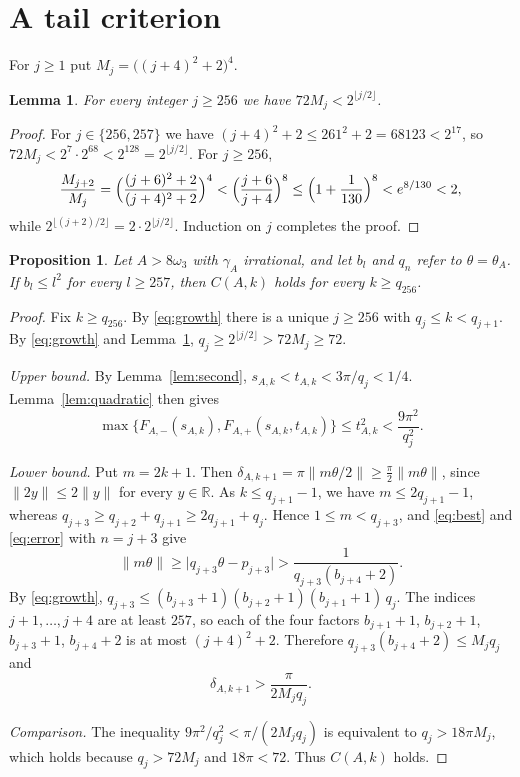 \documentclass{amsart}
\newtheorem{proposition}[theorem]{Proposition}
\newtheorem{lemma}[theorem]{Lemma}
\theoremstyle{definition}
\theoremstyle{remark}
\numberwithin{equation}{section}
\newcommand{\R}{\mathbb{R}}
\newcommand{\norm}[1]{\lVert #1 \rVert}
\begin{document}
\section{A tail criterion}\label{sec:tail}

For $j\ge1$ put $M_j=\bigl((j+4)^2+2\bigr)^4$.

\begin{lemma}\label{lem:numbers}
For every integer $j\ge256$ we have $72M_j<2^{\lfloor j/2\rfloor}$.
\end{lemma}

\begin{proof}
For $j\in\{256,257\}$ we have $(j+4)^2+2\le261^2+2=68123<2^{17}$, so $72M_j<2^7\cdot2^{68}<2^{128}=2^{\lfloor j/2\rfloor}$. For $j\ge256$,
\[
\frac{M_{j+2}}{M_j}=\Bigl(\frac{(j+6)^2+2}{(j+4)^2+2}\Bigr)^4<\Bigl(\frac{j+6}{j+4}\Bigr)^8\le\Bigl(1+\frac1{130}\Bigr)^8<e^{8/130}<2,
\]
while $2^{\lfloor (j+2)/2\rfloor}=2\cdot2^{\lfloor j/2\rfloor}$. Induction on $j$ completes the proof.
\end{proof}

\begin{proposition}\label{prop:tail}
Let $A>8\omega_3$ with $\gamma_A$ irrational, and let $b_l$ and $q_n$ refer to $\theta=\theta_A$. If $b_l\le l^2$ for every $l\ge257$, then $C(A,k)$ holds for every $k\ge q_{256}$.
\end{proposition}

\begin{proof}
Fix $k\ge q_{256}$. By \eqref{eq:growth} there is a unique $j\ge256$ with $q_j\le k<q_{j+1}$. By \eqref{eq:growth} and Lemma~\ref{lem:numbers}, $q_j\ge2^{\lfloor j/2\rfloor}>72M_j\ge72$.

\emph{Upper bound.} By Lemma~\ref{lem:second}, $s_{A,k}<t_{A,k}<3\pi/q_j<1/4$. Lemma~\ref{lem:quadratic} then gives
\[
\max\bigl\{F_{A,-}(s_{A,k}),F_{A,+}(s_{A,k},t_{A,k})\bigr\}\le t_{A,k}^2<\frac{9\pi^2}{q_j^2}.
\]

\emph{Lower bound.} Put $m=2k+1$. Then $\delta_{A,k+1}=\pi\norm{m\theta/2}\ge\frac\pi2\norm{m\theta}$, since $\norm{2y}\le2\norm{y}$ for every $y\in\R$. As $k\le q_{j+1}-1$, we have $m\le2q_{j+1}-1$, whereas $q_{j+3}\ge q_{j+2}+q_{j+1}\ge2q_{j+1}+q_j$. Hence $1\le m<q_{j+3}$, and \eqref{eq:best} and \eqref{eq:error} with $n=j+3$ give
\[
\norm{m\theta}\ge\lvert q_{j+3}\theta-p_{j+3}\rvert>\frac{1}{q_{j+3}(b_{j+4}+2)}.
\]
By \eqref{eq:growth}, $q_{j+3}\le(b_{j+3}+1)(b_{j+2}+1)(b_{j+1}+1)\,q_j$. The indices $j+1,\dots,j+4$ are at least $257$, so each of the four factors $b_{j+1}+1$, $b_{j+2}+1$, $b_{j+3}+1$, $b_{j+4}+2$ is at most $(j+4)^2+2$. Therefore $q_{j+3}(b_{j+4}+2)\le M_jq_j$ and
\[
\delta_{A,k+1}>\frac{\pi}{2M_jq_j}.
\]

\emph{Comparison.} The inequality $9\pi^2/q_j^2<\pi/(2M_jq_j)$ is equivalent to $q_j>18\pi M_j$, which holds because $q_j>72M_j$ and $18\pi<72$. Thus $C(A,k)$ holds.
\end{proof}
\end{document}
